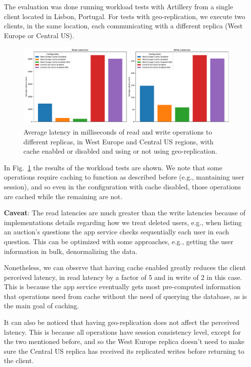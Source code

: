 \documentclass[runningheads]{llncs}
\begin{document}
The evaluation was done running workload tests with Artillery from a single client located in Lisbon, Portugal. For tests with geo-replication, we execute two clients, in the same location, each communicating with a different replica (West Europe or Central US).

\begin{figure}
    \includegraphics[width=\textwidth]{latencies}
    \caption{Average latency in milliseconds of read and write operations to different replicas, in West Europe and Central US regions, with cache enabled or disabled and using or not using geo-replication.} \label{fig:latencies}
\end{figure}

In Fig.~\ref{fig:latencies} the results of the workload tests are shown. We note that some operations require caching to function as described before (e.g., mantaining user session), and so even in the configuration with cache disabled, those operations are cached while the remaining are not.

\textbf{Caveat}: The read latencies are much greater than the write latencies because of implementations details regarding how we treat deleted users, e.g., when listing an auction's questions the app service checks sequentially each user in each question. This can be optimized with some approaches, e.g., getting the user information in bulk, denormalizing the data.

Nonetheless, we can observe that having cache enabled greatly reduces the client perceived latency, in read latency by a factor of 5 and in write of 2 in this case. This is because the app service eventually gets most pre-computed information that operations need from cache without the need of querying the database, as is the main goal of caching.

It can also be noticed that having geo-replication does not affect the perceived latency. This is because all operations have session consistency level, except for the two mentioned before, and so the West Europe replica doesn't need to make sure the Central US replica has received its replicated writes before returning to the client. 
\end{document}
